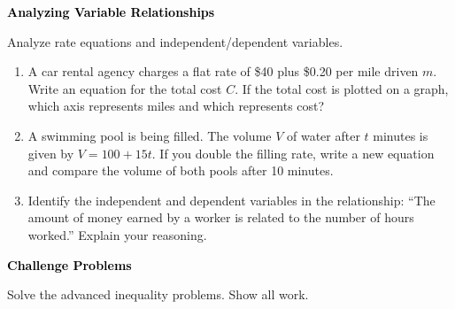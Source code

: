 \documentclass[12pt, letterpaper, fleqn]{article}
\begin{document}
\newpage

\begin{tcolorbox}[colback=black!10]
\large\textcolor{black}{\textbf{Analyzing Variable Relationships}}
\end{tcolorbox}

\noindent
Analyze rate equations and independent/dependent variables.

\vspace{3mm}

\begin{enumerate}[itemsep=2.2cm, leftmargin=0.6cm]

\item A car rental agency charges a flat rate of \$40 plus \$0.20 per mile driven $m$. Write an equation for the total cost $C$. If the total cost is plotted on a graph, which axis represents miles and which represents cost?

\vspace{2cm}

\item A swimming pool is being filled. The volume $V$ of water after $t$ minutes is given by $V = 100 + 15t$. If you double the filling rate, write a new equation and compare the volume of both pools after 10 minutes.

\vspace{2cm}

\item Identify the independent and dependent variables in the relationship: ``The amount of money earned by a worker is related to the number of hours worked.'' Explain your reasoning.

\vspace{2cm}

\end{enumerate}

\newpage

\begin{tcolorbox}[colback=black!10]
\large\textcolor{black}{\textbf{Challenge Problems}}
\end{tcolorbox}

\noindent
Solve the advanced inequality problems. Show all work.

\vspace{3mm}
\end{document}
